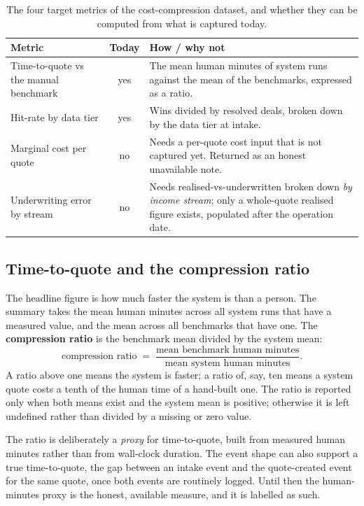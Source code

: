 \begin{table}[H]
\centering
\caption{The four target metrics of the cost-compression dataset, and whether they can be computed from what is captured today.}
\label{tab:metrics}
\small\sffamily
\begin{tabularx}{\textwidth}{@{}l c L@{}}
\toprule
\textbf{Metric} & \textbf{Today} & \textbf{How / why not} \\
\midrule
Time-to-quote vs the manual benchmark & yes & The mean human minutes of system runs against the mean of the benchmarks, expressed as a ratio. \\
Hit-rate by data tier & yes & Wins divided by resolved deals, broken down by the data tier at intake. \\
Marginal cost per quote & no & Needs a per-quote cost input that is not captured yet. Returned as an honest unavailable note. \\
Underwriting error by stream & no & Needs realised-vs-underwritten broken down \emph{by income stream}; only a whole-quote realised figure exists, populated after the operation date. \\
\bottomrule
\end{tabularx}
\end{table}

\subsection{Time-to-quote and the compression ratio}

The headline figure is how much faster the system is than a person. The summary takes the mean human minutes across all system runs that have a measured value, and the mean across all benchmarks that have one. The \textbf{compression ratio} is the benchmark mean divided by the system mean:
\[
\text{compression ratio} \;=\; \frac{\text{mean benchmark human minutes}}{\text{mean system human minutes}}.
\]
A ratio above one means the system is faster; a ratio of, say, ten means a system quote costs a tenth of the human time of a hand-built one. The ratio is reported only when both means exist and the system mean is positive; otherwise it is left undefined rather than divided by a missing or zero value.

\begin{plainnote}
The ratio is deliberately a \emph{proxy} for time-to-quote, built from measured human minutes rather than from wall-clock duration. The event shape can also support a true time-to-quote, the gap between an intake event and the quote-created event for the same quote, once both events are routinely logged. Until then the human-minutes proxy is the honest, available measure, and it is labelled as such.
\end{plainnote}

